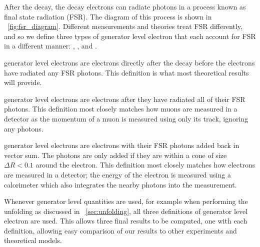 After the \Ztoee decay, the decay electrons can radiate photons in a process
known as final state radiation (FSR). The diagram of this process is shown
in \FIG~\ref{fig:fsr_diagram}. Different measurements and theories treat FSR
differently, and so we define three types of generator level electron that each
account for FSR in a different manner: \born, \bare, and \dressed.

\Born generator level electrons are electrons directly after the \Ztoee decay
before the electrons have radiated any FSR photons. This definition is what
most theoretical results will provide.

\Bare generator level electrons are \born electrons after they have radiated all
of their FSR photons. This definition most closely matches how muons are
measured in a detector as the momentum of a muon is measured using only its
track, ignoring any photons.

\Dressed generator level electrons are \bare electrons with their FSR photons
added back in vector sum. The photons are only added if they are within a cone
of size $\Delta R < 0.1$ around the electron. This definition most closely
matches how electrons are measured in a detector; the energy of the electron is
measured using a calorimeter which also integrates the nearby photons into the
measurement.

Whenever generator level quantities are used, for example when performing the
unfolding as discussed in \CHP~\ref{sec:unfolding}, all three definitions
of generator level electron are used. This allows three final results to be
computed, one with each definition, allowing easy comparison of our results to
other experiments and theoretical models.

